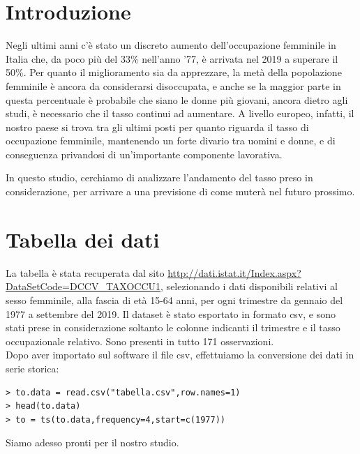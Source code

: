 \documentclass[11pt,a4paper,oneside]{article}
\begin{document}
\baselineskip 22pt

\tableofcontents\thispagestyle{empty}\clearpage

\section{Introduzione}
\baselineskip 12pt
Negli ultimi anni c'è stato un discreto aumento dell'occupazione femminile in Italia che, da poco più del 33\% nell'anno '77, è arrivata nel 2019 a superare il 50\%. Per quanto il miglioramento sia da apprezzare, la metà della popolazione femminile è ancora da considerarsi disoccupata, e anche se la maggior parte in questa percentuale è probabile che siano le donne più giovani, ancora dietro agli studi, è necessario che il tasso continui ad aumentare. A livello europeo, infatti, il nostro paese si trova tra gli ultimi posti per quanto riguarda il tasso di occupazione femminile, mantenendo un forte divario tra uomini e donne, e di conseguenza privandosi di un'importante componente lavorativa.

In questo studio, cerchiamo di analizzare l'andamento del tasso preso in considerazione, per arrivare a una previsione di come muterà nel futuro prossimo.

\section{Tabella dei dati}
La tabella è stata recuperata dal sito \url{http://dati.istat.it/Index.aspx?DataSetCode=DCCV_TAXOCCU1}, selezionando i dati disponibili relativi al sesso femminile, alla fascia di età 15-64 anni, per ogni trimestre da gennaio del 1977 a settembre del 2019. Il dataset è stato esportato in formato csv, e sono stati prese in considerazione soltanto le colonne indicanti il trimestre e il tasso occupazionale relativo. Sono presenti in tutto 171 osservazioni.\\
Dopo aver importato sul software il file csv, effettuiamo la conversione dei dati in serie storica:
\begin{verbatim}
> to.data = read.csv("tabella.csv",row.names=1)
> head(to.data)
> to = ts(to.data,frequency=4,start=c(1977))
\end{verbatim}
Siamo adesso pronti per il nostro studio.
\end{document}
